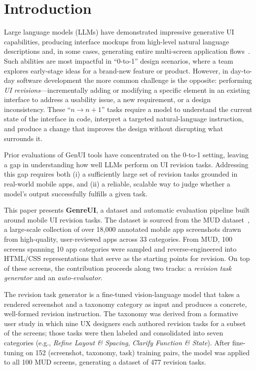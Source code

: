 \documentclass[sigconf,nonacm]{acmart}
\begin{document}
\maketitle

\section{Introduction}
\label{sec:intro}

Large language models (LLMs) have demonstrated impressive generative UI capabilities, producing interface mockups from high-level natural language descriptions and, in some cases, generating entire multi-screen application flows~\cite{leviathan2026genui}. Such abilities are most impactful in ``0-to-1'' design scenarios, where a team explores early-stage ideas for a brand-new feature or product. However, in day-to-day software development the more common challenge is the opposite: performing \emph{UI revisions}—incrementally adding or modifying a specific element in an existing interface to address a usability issue, a new requirement, or a design inconsistency. These ``$n \to n+1$'' tasks require a model to understand the current state of the interface in code, interpret a targeted natural-language instruction, and produce a change that improves the design without disrupting what surrounds it.

Prior evaluations of GenUI tools have concentrated on the 0-to-1 setting, leaving a gap in understanding how well LLMs perform on UI revision tasks. Addressing this gap requires both (i) a sufficiently large set of revision tasks grounded in real-world mobile apps, and (ii) a reliable, scalable way to judge whether a model's output successfully fulfills a given task.

This paper presents \textbf{GenreUI}, a dataset and automatic evaluation pipeline built around mobile UI revision tasks. The dataset is sourced from the MUD dataset~\cite{feng2024mud}, a large-scale collection of over 18,000 annotated mobile app screenshots drawn from high-quality, user-reviewed apps across 33 categories. From MUD, 100 screens spanning 10 app categories were sampled and reverse-engineered into HTML/CSS representations that serve as the starting points for revision. On top of these screens, the contribution proceeds along two tracks: a \emph{revision task generator} and an \emph{auto-evaluator}.

The revision task generator is a fine-tuned vision-language model that takes a rendered screenshot and a taxonomy category as input and produces a concrete, well-formed revision instruction. The taxonomy was derived from a formative user study in which nine UX designers each authored revision tasks for a subset of the screens; those tasks were then labeled and consolidated into seven categories (e.g., \emph{Refine Layout \& Spacing}, \emph{Clarify Function \& State}). After fine-tuning on 152 (screenshot, taxonomy, task) training pairs, the model was applied to all 100 MUD screens, generating a dataset of 477 revision tasks.
\end{document}
